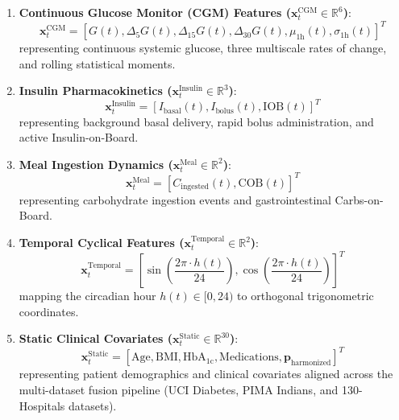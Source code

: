 \documentclass[10pt,journal,compsoc,twocolumn]{IEEEtran}
\begin{document}
\begin{enumerate}
    \item \textbf{Continuous Glucose Monitor (CGM) Features ($\mathbf{x}_t^{\text{CGM}} \in \mathbb{R}^6$)}:
    \begin{equation}
    \mathbf{x}_t^{\text{CGM}} = \left[ G(t), \Delta_5 G(t), \Delta_{15} G(t), \Delta_{30} G(t), \mu_{1\text{h}}(t), \sigma_{1\text{h}}(t) \right]^T
    \end{equation}
    representing continuous systemic glucose, three multiscale rates of change, and rolling statistical moments.
    
    \item \textbf{Insulin Pharmacokinetics ($\mathbf{x}_t^{\text{Insulin}} \in \mathbb{R}^3$)}:
    \begin{equation}
    \mathbf{x}_t^{\text{Insulin}} = \left[ I_{\text{basal}}(t), I_{\text{bolus}}(t), \text{IOB}(t) \right]^T
    \end{equation}
    representing background basal delivery, rapid bolus administration, and active Insulin-on-Board.
    
    \item \textbf{Meal Ingestion Dynamics ($\mathbf{x}_t^{\text{Meal}} \in \mathbb{R}^2$)}:
    \begin{equation}
    \mathbf{x}_t^{\text{Meal}} = \left[ C_{\text{ingested}}(t), \text{COB}(t) \right]^T
    \end{equation}
    representing carbohydrate ingestion events and gastrointestinal Carbs-on-Board.
    
    \item \textbf{Temporal Cyclical Features ($\mathbf{x}_t^{\text{Temporal}} \in \mathbb{R}^2$)}:
    \begin{equation}
    \mathbf{x}_t^{\text{Temporal}} = \left[ \sin\left(\frac{2\pi \cdot h(t)}{24}\right), \cos\left(\frac{2\pi \cdot h(t)}{24}\right) \right]^T
    \end{equation}
    mapping the circadian hour $h(t) \in [0, 24)$ to orthogonal trigonometric coordinates.
    
    \item \textbf{Static Clinical Covariates ($\mathbf{x}_t^{\text{Static}} \in \mathbb{R}^{30}$)}:
    \begin{equation}
    \mathbf{x}_t^{\text{Static}} = \left[ \text{Age}, \text{BMI}, \text{HbA}_{1\text{c}}, \text{Medications}, \mathbf{p}_{\text{harmonized}} \right]^T
    \end{equation}
    representing patient demographics and clinical covariates aligned across the multi-dataset fusion pipeline (UCI Diabetes, PIMA Indians, and 130-Hospitals datasets).
\end{enumerate}
\end{document}

